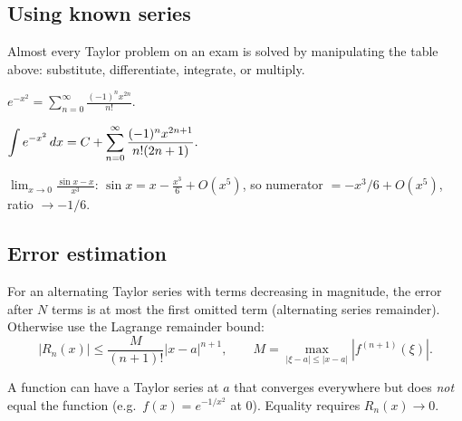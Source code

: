\subsection{Using known series}
Almost every Taylor problem on an exam is solved by manipulating the table above:
substitute, differentiate, integrate, or multiply.

\begin{example}[Substitution]
$\displaystyle e^{-x^2} = \sum_{n=0}^\infty \frac{(-1)^n x^{2n}}{n!}.$
\end{example}

\begin{example}
$\displaystyle \int e^{-x^2} \,dx = C + \sum_{n=0}^\infty \frac{(-1)^n x^{2n+1}}{n! (2n+1)}.$
\end{example}

\begin{example}
$\displaystyle \lim_{x \to 0} \frac{\sin x - x}{x^3}$:
$\sin x = x - \tfrac{x^3}{6} + O(x^5)$, so numerator $= -x^3/6 + O(x^5)$, ratio $\to -1/6$.
\end{example}

\subsection{Error estimation}
For an alternating Taylor series with terms decreasing in magnitude, the error after $N$ terms
is at most the first omitted term (alternating series remainder).
Otherwise use the Lagrange remainder bound:
\[ |R_n(x)| \le \frac{M}{(n+1)!} |x - a|^{n+1}, \qquad M = \max_{|\xi - a| \le |x - a|} |f^{(n+1)}(\xi)|. \]

\begin{pitfallbox}
A function can have a Taylor series at $a$ that converges everywhere but does \emph{not} equal
the function (e.g.\ $f(x) = e^{-1/x^2}$ at $0$). Equality requires $R_n(x) \to 0$.
\end{pitfallbox}
